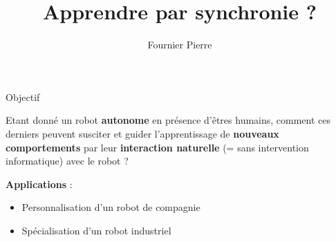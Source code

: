 \documentclass[xcolor=pst,dvips,12pt,english,french]{beamer}
\title{Apprendre par synchronie ?}
\author{Fournier Pierre}
\begin{document}
	\frame{\titlepage} 
	
	
	\begin{frame}{Objectif}
		\begin{block}{}
			Etant donné un robot \textbf{autonome} en présence d'êtres humains, comment ces derniers peuvent susciter et guider l'apprentissage de \textbf{nouveaux comportements} par leur \textbf{interaction naturelle} (= sans intervention informatique) avec le robot ?
		\end{block}
		\begin{exampleblock}{}
			\textbf{Applications} : 
			\begin{itemize}
				\item Personnalisation d'un robot de compagnie 
				\item Spécialisation d'un robot industriel 
			\end{itemize}
		\end{exampleblock}
	\end{frame}
	
\end{document}

